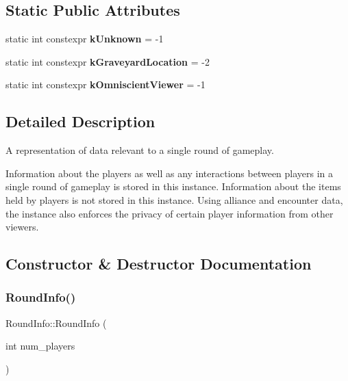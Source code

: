 \subsection*{Static Public Attributes}
\begin{DoxyCompactItemize}
\item 
\mbox{\label{classroundinfo_1_1_round_info_a6a7ac5df8cced5aac3c30a98f88df3d9}} 
static int constexpr {\bfseries k\+Unknown} = -\/1
\item 
\mbox{\label{classroundinfo_1_1_round_info_a316f9f9173bcbf923181a84deb70c4d0}} 
static int constexpr {\bfseries k\+Graveyard\+Location} = -\/2
\item 
\mbox{\label{classroundinfo_1_1_round_info_a29eb9d113e033613762e50e1aaf63290}} 
static int constexpr {\bfseries k\+Omniscient\+Viewer} = -\/1
\end{DoxyCompactItemize}


\subsection{Detailed Description}
A representation of data relevant to a single round of gameplay. 

Information about the players as well as any interactions between players in a single round of gameplay is stored in this instance. Information about the items held by players is  not stored in this instance. Using alliance and encounter data, the instance also enforces the privacy of certain player information from other viewers. 

\subsection{Constructor \& Destructor Documentation}
\mbox{\label{classroundinfo_1_1_round_info_abf54268ebef648dc57353dd2fd6374b5}} 
\subsubsection{\texorpdfstring{Round\+Info()}{RoundInfo()}}
{\footnotesize\ttfamily Round\+Info\+::\+Round\+Info (\begin{DoxyParamCaption}\item[{int}]{num\+\_\+players }\end{DoxyParamCaption})}



